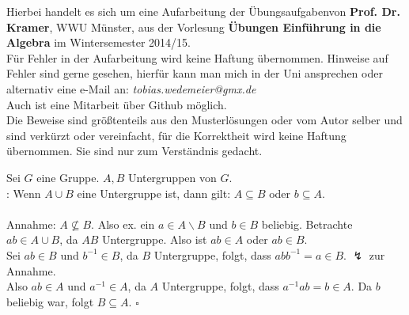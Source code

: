 

\newcommand{\vorlesung}{Übungen Einführung in die Algebra}
\newcommand{\subt}{Aufarbeitung der Übungsaufgaben}
\newcommand{\Prof}{Prof. Dr. Kramer}






\maketitle
\thispagestyle{empty}
\newpage
	
\thispagestyle{empty}
\vspace*{\fill}
\begin{center}
	Hierbei handelt es sich um eine \subt von \textbf{\Prof}, WWU Münster, aus der Vorlesung \textbf{\vorlesung} im Wintersemester 2014/15.\\
	\vspace{2cm}
	Für Fehler in der Aufarbeitung wird keine Haftung übernommen. Hinweise auf Fehler sind gerne gesehen, hierfür kann man mich in der Uni ansprechen oder alternativ eine e-Mail an: \textit{tobias.wedemeier@gmx.de}\\
	Auch ist eine Mitarbeit über Github möglich.\\
	\vspace{2cm}
	Die Beweise sind größtenteils aus den Musterlösungen oder vom Autor selber und sind verkürzt oder vereinfacht, für die Korrektheit wird keine Haftung übernommen. Sie sind nur zum Verständnis gedacht.
\end{center}
\vspace*{\fill}
\newpage
	
	
\tableofcontents
\cleardoubleoddemptypage %
	
\setcounter{page}{1}


\label{sub:zettel_1alg}
Sei $G$ eine Gruppe. $A,B$ Untergruppen von $G$.\\
\zz: Wenn $A\cup B$ eine Untergruppe ist, dann gilt: $A\subseteq B$ oder $b\subseteq A$.\\

\\
Annahme: $A\not\subseteq B$. Also ex. ein $a\in A\backslash B$ und $b\in B$ beliebig. Betrachte $ab\in A\cup B$, da $AB$ Untergruppe. Also ist $ab\in A$ oder $ab\in B$.\\
Sei $ab\in B$ und $b^{-1}\in B$, da $B$ Untergruppe, folgt, dass $abb^{-1}=a\in B$. $\lightning$ zur Annahme.\\
Also $ab\in A$ und $a^{-1}\in A$, da $A$ Untergruppe, folgt, dass $a^{-1}ab=b\in A$. Da $b$ beliebig war, folgt $B\subseteq A$.
\hfill $\square$

